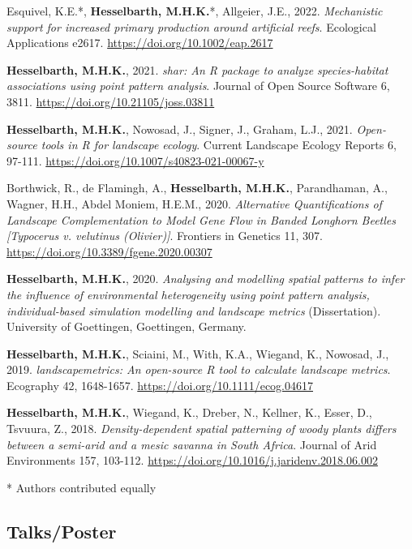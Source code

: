 \documentclass[12pt, hidelinks]{report}
\begin{document}
\begin{hangparas}{7.5mm}{1}

Esquivel, K.E.*, \textbf{Hesselbarth, M.H.K.}*, Allgeier, J.E., 2022. \textit{Mechanistic support for increased primary production around artificial reefs}. Ecological Applications e2617. \url{https://doi.org/10.1002/eap.2617}

\textbf{Hesselbarth, M.H.K.}, 2021. \textit{shar: An R package to analyze species-habitat associations using point pattern analysis}. Journal of Open Source Software 6, 3811. \url{https://doi.org/10.21105/joss.03811}

\textbf{Hesselbarth, M.H.K.}, Nowosad, J., Signer, J., Graham, L.J., 2021. \textit{Open-source tools in R for landscape ecology}. Current Landscape Ecology Reports 6, 97-111. \url{https://doi.org/10.1007/s40823-021-00067-y}

Borthwick, R., de Flamingh, A., \textbf{Hesselbarth, M.H.K.}, Parandhaman, A., Wagner, H.H., Abdel Moniem, H.E.M., 2020. \textit{Alternative Quantifications of Landscape Complementation to Model Gene Flow in Banded Longhorn Beetles [Typocerus v. velutinus (Olivier)]}. Frontiers in Genetics 11, 307. \url{https://doi.org/10.3389/fgene.2020.00307}

\textbf{Hesselbarth, M.H.K.}, 2020. \textit{Analysing and modelling spatial patterns to infer the influence of environmental heterogeneity using point pattern analysis, individual-based simulation modelling and landscape metrics} (Dissertation). University of Goettingen, Goettingen, Germany.

\textbf{Hesselbarth, M.H.K.}, Sciaini, M., With, K.A., Wiegand, K., Nowosad, J., 2019. \textit{landscapemetrics: An open-source R tool to calculate landscape metrics}. Ecography 42, 1648-1657. \url{https://doi.org/10.1111/ecog.04617}

\textbf{Hesselbarth, M.H.K.}, Wiegand, K., Dreber, N., Kellner, K., Esser, D., Tsvuura, Z., 2018. \textit{Density-dependent spatial patterning of woody plants differs between a semi-arid and a mesic savanna in South Africa}. Journal of Arid Environments 157, 103-112. \url{https://doi.org/10.1016/j.jaridenv.2018.06.002}

\end{hangparas}

* Authors contributed equally

\subsection*{Talks/Poster}
\end{document}
